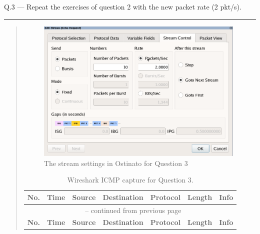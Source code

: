 \documentclass{article}
\newcommand\Que[2]{%
   \begin{samepage}
   \leavevmode\par
   \noindent
   Q.#1 --- #2\par\vspace{10pt}\hrule\vspace{10pt}
   \end{samepage}}
\newenvironment{ans}
   {\fbox{Answer}\begin{quote}\nopagebreak}
   {\end{quote}}
\newcommand\INFOCOLSIZE{13em}
\begin{document}
\newpage

\Que{3}{Repeat the exercises of question 2 with the new packet
rate (2 pkt/s).}

\begin{ans}
\begin{figure}[H]
\centering
\includegraphics[width=10cm]{data/q3-stream-settings.png}
\caption{The stream settings in Ostinato for Question 3}
\label{fig:stream-settings-q3}
\end{figure}

\begin{center}
\begin{longtable}{|l|l|l|l|l|l|p{\INFOCOLSIZE}|}
\caption{Wireshark ICMP capture for Question 3.}
\label{longtable:wireshark-cap-q3}                                                                             \\
\hline
\multicolumn{1}{|c|}{\textbf{No.}}        &
\multicolumn{1}{c|}{\textbf{Time}}        &
\multicolumn{1}{c|}{\textbf{Source}}      &
\multicolumn{1}{c|}{\textbf{Destination}} &
\multicolumn{1}{c|}{\textbf{Protocol}}    &
\multicolumn{1}{c|}{\textbf{Length}}      &
\multicolumn{1}{c|}{\textbf{Info}}                                                                             \\
\hline
\endfirsthead

\multicolumn{7}{c}{\tablename\ \thetable{} -- continued from previous page}                                    \\
\hline
\multicolumn{1}{|c|}{\textbf{No.}}        &
\multicolumn{1}{c|}{\textbf{Time}}        &
\multicolumn{1}{c|}{\textbf{Source}}      &
\multicolumn{1}{c|}{\textbf{Destination}} &
\multicolumn{1}{c|}{\textbf{Protocol}}    &
\multicolumn{1}{c|}{\textbf{Length}}      &
\multicolumn{1}{c|}{\textbf{Info}}                                                                             \\
\hline
\endhead


\end{longtable}
\end{center}
\end{ans}
\end{document}
